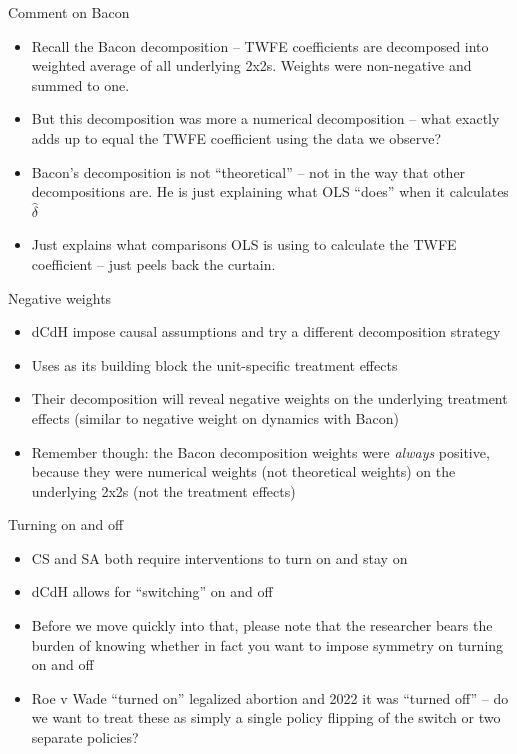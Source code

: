\documentclass{beamer}
\begin{document}
\begin{frame}{Comment on Bacon}

\begin{itemize}
\item Recall the Bacon decomposition -- TWFE coefficients are decomposed into weighted average of all underlying 2x2s. Weights were non-negative and summed to one.
\item But this decomposition was more a numerical decomposition -- what exactly adds up to equal the TWFE coefficient using the data we observe?
\item Bacon's decomposition is not ``theoretical'' -- not in the way that other decompositions are. He is just explaining what OLS ``does'' when it calculates $\widehat{\delta}$
\item Just explains what comparisons OLS is using to calculate the TWFE coefficient -- just peels back the curtain.
\end{itemize}

\end{frame}

\begin{frame}{Negative weights}

\begin{itemize}
\item dCdH impose causal assumptions and try a different decomposition strategy
\item Uses as its building block the unit-specific treatment effects
\item Their decomposition will reveal negative weights on the underlying treatment effects (similar to negative weight on dynamics with Bacon)
\item Remember though: the Bacon decomposition weights were \emph{always} positive, because they were numerical weights (not theoretical weights) on the underlying 2x2s (not the treatment effects)
\end{itemize}

\end{frame}

\begin{frame}{Turning on and off}

\begin{itemize}
\item CS and SA both require interventions to turn on and stay on
\item dCdH allows for ``switching'' on and off 
\item Before we move quickly into that, please note that the researcher bears the burden of knowing whether in fact you want to impose symmetry on turning on and off
\item Roe v Wade ``turned on'' legalized abortion and 2022 it was ``turned off'' -- do we want to treat these as simply a single policy flipping of the switch or two separate policies?
\end{itemize}

\end{frame}
\end{document}
